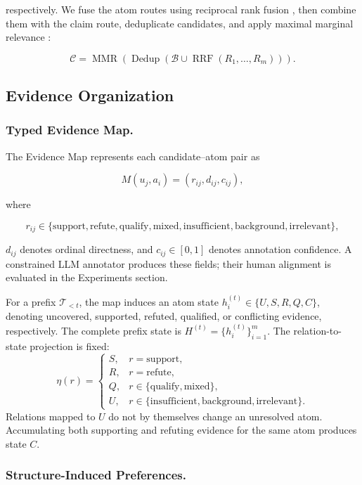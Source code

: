 \documentclass[letterpaper]{article}
\begin{document}
respectively. We fuse the atom routes using reciprocal rank fusion
\citep{Cormack2009RRF}, then combine them with the claim route,
deduplicate candidates, and apply maximal marginal relevance
\citep{Goldstein1998MMR}:

\[
\mathcal C=
\operatorname{MMR}\!\left(
\operatorname{Dedup}\!\left(
\mathcal B\cup
\operatorname{RRF}(R_1,\ldots,R_m)
\right)\right).
\]
\subsection{Evidence Organization}

\subsubsection{Typed Evidence Map.}

The Evidence Map represents each candidate--atom pair as

\[
M(u_j,a_i)=(r_{ij},d_{ij},c_{ij}),
\]

where

\[
r_{ij}\in\{
\text{support},\text{refute},\text{qualify},
\text{mixed},\text{insufficient},\text{background},
\text{irrelevant}
\},
\]

$d_{ij}$ denotes ordinal directness, and $c_{ij}\in[0,1]$ denotes
annotation confidence. A constrained LLM annotator produces these
fields; their human alignment is evaluated in the Experiments section.

For a prefix $\mathcal T_{<t}$, the map induces an atom state
$h_i^{(t)}\in\{U,S,R,Q,C\}$, denoting uncovered, supported, refuted,
qualified, or conflicting evidence, respectively. The complete prefix
state is $H^{(t)}=\{h_i^{(t)}\}_{i=1}^{m}$.
The relation-to-state projection is fixed:
\[
\eta(r)=
\begin{cases}
S,&r=\text{support},\\
R,&r=\text{refute},\\
Q,&r\in\{\text{qualify},\text{mixed}\},\\
U,&r\in\{\text{insufficient},\text{background},\text{irrelevant}\}.
\end{cases}
\]
Relations mapped to \(U\) do not by themselves change an unresolved
atom. Accumulating both supporting and refuting evidence for the same
atom produces state \(C\).

\subsubsection{Structure-Induced Preferences.}
\end{document}
